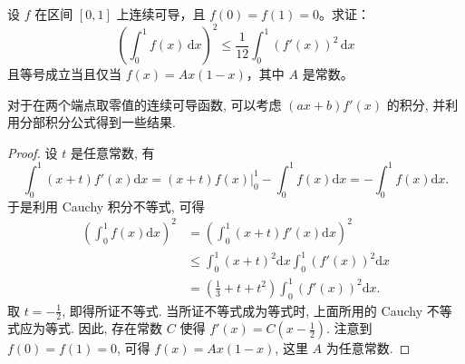 \documentclass[../../main.tex]{subfiles}%
\begin{document}
\begin{example}
设 \( f \) 在区间 \([0,1]\) 上连续可导，且 \( f(0) = f(1) = 0 \)。求证：
\[
\left( \int_{0}^{1} f(x) \, \mathrm{d}x \right)^{2} \leqslant \frac{1}{12} \int_{0}^{1} \left( f'(x) \right)^{2} \, \mathrm{d}x
\]
且等号成立当且仅当 \( f(x) = Ax(1 - x) \)，其中 \( A \) 是常数。
\end{example}
\begin{note}
对于在两个端点取零值的连续可导函数, 可以考虑 \((ax + b)f'(x)\) 的积分, 并利用分部积分公式得到一些结果.
\end{note}
\begin{proof}

设 \(t\) 是任意常数, 有
\[
\int_0^1 (x + t)f'(x)\mathrm{d}x = (x + t)f(x) \Big|_0^1 - \int_0^1 f(x)\mathrm{d}x = -\int_0^1 f(x)\mathrm{d}x.
\]
于是利用 Cauchy 积分不等式, 可得
\begin{align*}
\left(\int_0^1 f(x)\mathrm{d}x\right)^2 &= \left(\int_0^1 (x + t)f'(x)\mathrm{d}x\right)^2\\
&\leqslant \int_0^1 (x + t)^2\mathrm{d}x \int_0^1 (f'(x))^2\mathrm{d}x\\
&= \left(\frac{1}{3} + t + t^2\right)\int_0^1 (f'(x))^2\mathrm{d}x.
\end{align*}
取 \(t = -\frac{1}{2}\), 即得所证不等式. 当所证不等式成为等式时, 上面所用的 Cauchy 不等式应为等式. 因此, 存在常数 \(C\) 使得 \(f'(x) = C\left(x - \frac{1}{2}\right)\). 注意到 \(f(0) = f(1) = 0\), 可得 \(f(x) = Ax(1 - x)\), 这里 \(A\) 为任意常数.

\end{proof}
\end{document}
